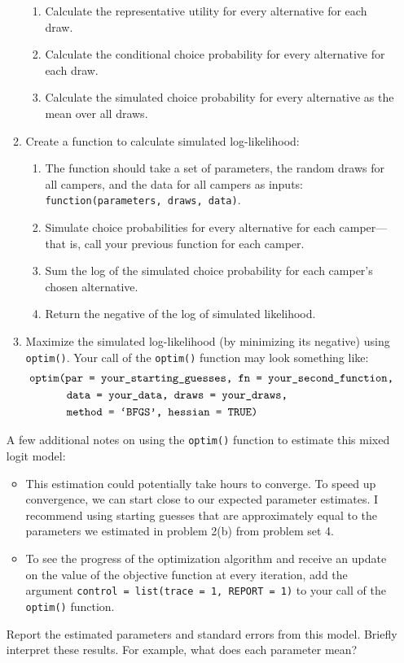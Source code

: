 \documentclass[11pt,letterpaper]{article}\usepackage[]{graphicx}\usepackage[]{xcolor}
\begin{document}
\begin{enumerate}[label=\alph*., leftmargin=*]
\begin{enumerate}[label=\Roman*.]
\begin{enumerate}[label=\roman*.]
			\item Calculate the representative utility for every alternative for each draw.
			\item Calculate the conditional choice probability for every alternative for each draw.
			\item Calculate the simulated choice probability for every alternative as the mean over all draws.
		\end{enumerate}
		\item Create a function to calculate simulated log-likelihood:
		\begin{enumerate}[label=\roman*.]
			\item The function should take a set of parameters, the random draws for all campers, and the data for all campers as inputs: \texttt{function(parameters, draws, data)}.
			\item Simulate choice probabilities for every alternative for each camper---that is, call your previous function for each camper.
			\item Sum the log of the simulated choice probability for each camper's chosen alternative.
			\item Return the negative of the log of simulated likelihood.
		\end{enumerate}
		\item Maximize the simulated log-likelihood (by minimizing its negative) using \texttt{optim()}. Your call of the \texttt{optim()} function may look something like:
		\begin{align*}
			&\text{\texttt{optim(par = your\_starting\_guesses, fn = your\_second\_function,}} \\
			& \qquad \quad \; \text{\texttt{data = your\_data, draws = your\_draws,}} \\
			& \qquad \quad \; \text{\texttt{method = `BFGS', hessian = TRUE)}}
		\end{align*}
	\end{enumerate}
	A few additional notes on using the \texttt{optim()} function to estimate this mixed logit model:
	\begin{itemize}
		\item This estimation could potentially take hours to converge. To speed up convergence, we can start close to our expected parameter estimates. I recommend using starting guesses that are approximately equal to the parameters we estimated in problem 2(b) from problem set 4.
		\item To see the progress of the optimization algorithm and receive an update on the value of the objective function at every iteration, add the argument \texttt{control = list(trace = 1, REPORT = 1)} to your call of the \texttt{optim()} function.
	\end{itemize}
	Report the estimated parameters and standard errors from this model. Briefly interpret these results. For example, what does each parameter mean?


\end{enumerate}
\end{document}

